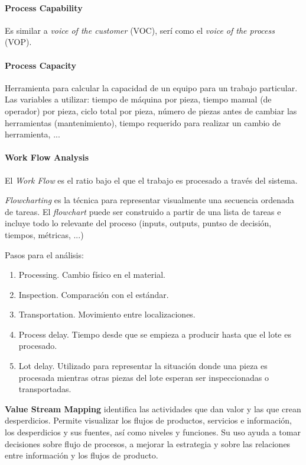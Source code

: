 \documentclass[]{article}
\begin{document}
\paragraph{Process Capability}
Es similar a \textit{voice of the customer} (VOC), serí como el \textit{voice of the process} (VOP).

\paragraph{Process Capacity}
Herramienta para calcular la capacidad de un equipo para un trabajo particular. Las variables a utilizar: tiempo de máquina por pieza, tiempo manual (de operador) por pieza, ciclo total por pieza, número de piezas antes de cambiar las herramientas (mantenimiento), tiempo requerido para realizar un cambio de herramienta, ...

\paragraph{Work Flow Analysis}
El \textit{Work Flow} es el ratio bajo el que el trabajo es procesado a través del sistema.

\textit{Flowcharting} es la técnica para representar visualmente una secuencia ordenada de tareas. El \textit{flowchart} puede ser construido a partir de una lista de tareas e incluye todo lo relevante del proceso (inputs, outputs, puntso de decisión, tiempos, métricas, ...)

Pasos para el análisis:
\begin{enumerate}
	\item Processing. Cambio físico en el material.
	\item Inspection. Comparación con el estándar.
	\item Transportation. Movimiento entre localizaciones.
	\item Process delay. Tiempo desde que se empieza a producir hasta que el lote es procesado.
	\item Lot delay. Utilizado para representar la situación donde una pieza es procesada mientras otras piezas del lote esperan ser inspeccionadas o transportadas.
\end{enumerate}

\textbf{Value Stream Mapping} identifica las actividades que dan valor y las que crean desperdicios. Permite visualizar los flujos de productos, servicios e información, los desperdicios y sus fuentes, así como niveles y funciones. Su uso ayuda a tomar decisiones sobre flujo de procesos, a mejorar la estrategia y sobre las relaciones entre información y los flujos de producto.
\end{document}
